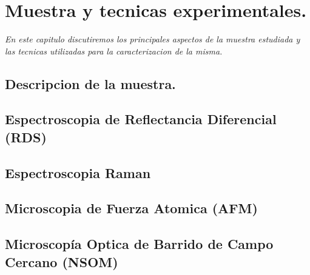 \chapter{Muestra y tecnicas experimentales.}
\label{chap:techniques-and-sample}
\textit{En este capitulo discutiremos los principales aspectos de la muestra estudiada y las tecnicas utilizadas para la caracterizacion de la misma.}
\vfill
\minitoc
\newpage

\section{Descripcion de la muestra.}
\label{sec:chap3-sample-description}
\newpage
\section{Espectroscopia de Reflectancia Diferencial (RDS)}
\label{sec:chap3-rds}
\newpage
\section{Espectroscopia Raman}
\label{sec:chap3-raman}
\newpage
\section{Microscopia de Fuerza Atomica (AFM)}
\label{sec:chap3-afm}
\newpage
\section{Microscopía Optica de Barrido de Campo Cercano (NSOM)}
\label{sec:chap3-nsom}
\newpage
